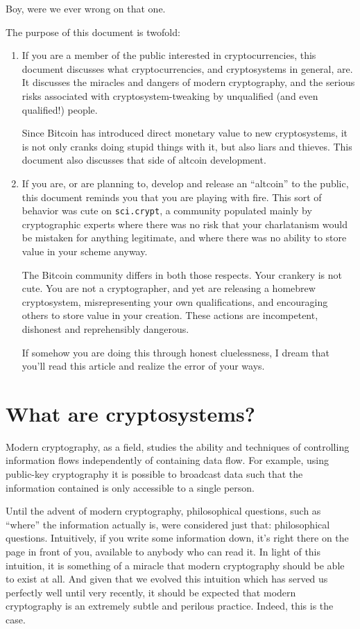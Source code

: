 \documentclass[letterpaper]{article}
\begin{document}
Boy, were we ever wrong on that one.

The purpose of this document is twofold:
\begin{enumerate}
\item If you are a member of the public interested in cryptocurrencies,
this document discusses what cryptocurrencies, and cryptosystems in general,
are. It discusses the miracles and dangers of modern cryptography, and
the serious risks associated with cryptosystem-tweaking by unqualified
(and even qualified!) people.

Since Bitcoin has introduced direct monetary value to new cryptosystems,
it is not only cranks doing stupid things with it, but also liars and
thieves. This document also discusses that side of altcoin development.
\item If you are, or are planning to, develop and release an ``altcoin''
to the public, this document reminds you that you are playing with fire.
This sort of behavior was cute on \texttt{sci.crypt}, a community populated
mainly by cryptographic experts where there was no risk that your charlatanism
would be mistaken for anything legitimate, and where there was no ability to
store value in your scheme anyway.

The Bitcoin community differs in both those respects. Your crankery is
not cute. You are not a cryptographer, and yet are releasing a homebrew
cryptosystem, misrepresenting your own qualifications, and encouraging
others to store value in your creation. These actions are incompetent,
dishonest and reprehensibly dangerous.

If somehow you are doing this through honest cluelessness, I dream that
you'll read this article and realize the error of your ways.
\end{enumerate}

\section{What are cryptosystems?}

Modern cryptography, as a field, studies the ability and techniques of
controlling information flows independently of containing data flow.
For example, using public-key cryptography it is possible to broadcast
data such that the information contained is only accessible to a single
person.

Until the advent of modern cryptography, philosophical questions, such
as ``where'' the information actually is, were considered just that:
philosophical questions. Intuitively, if you write some information
down, it's right there on the page in front of you, available to anybody
who can read it. In light of this intuition, it is something of a miracle
that modern cryptography should be able to exist at all. And given that
we evolved this intuition which has served us perfectly well until very
recently, it should be expected that modern cryptography is an extremely
subtle and perilous practice. Indeed, this is the case.
\end{document}
